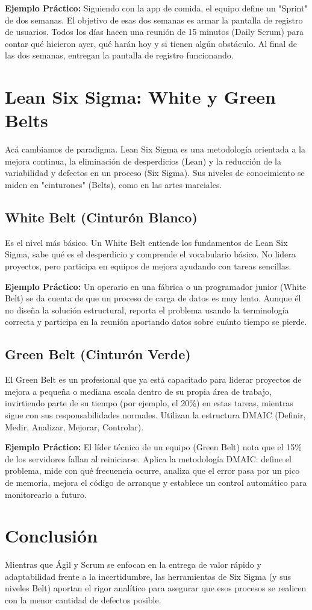 \documentclass[11pt,a4paper]{article}
\begin{document}
\textbf{Ejemplo Práctico:} Siguiendo con la app de comida, el equipo define un "Sprint" de dos semanas. El objetivo de esas dos semanas es armar la pantalla de registro de usuarios. Todos los días hacen una reunión de 15 minutos (Daily Scrum) para contar qué hicieron ayer, qué harán hoy y si tienen algún obstáculo. Al final de las dos semanas, entregan la pantalla de registro funcionando.

\section{Lean Six Sigma: White y Green Belts}
Acá cambiamos de paradigma. Lean Six Sigma es una metodología orientada a la mejora continua, la eliminación de desperdicios (Lean) y la reducción de la variabilidad y defectos en un proceso (Six Sigma). Sus niveles de conocimiento se miden en "cinturones" (Belts), como en las artes marciales.

\subsection{White Belt (Cinturón Blanco)}
Es el nivel más básico. Un White Belt entiende los fundamentos de Lean Six Sigma, sabe qué es el desperdicio y comprende el vocabulario básico. No lidera proyectos, pero participa en equipos de mejora ayudando con tareas sencillas.

\textbf{Ejemplo Práctico:} Un operario en una fábrica o un programador junior (White Belt) se da cuenta de que un proceso de carga de datos es muy lento. Aunque él no diseña la solución estructural, reporta el problema usando la terminología correcta y participa en la reunión aportando datos sobre cuánto tiempo se pierde.

\subsection{Green Belt (Cinturón Verde)}
El Green Belt es un profesional que ya está capacitado para liderar proyectos de mejora a pequeña o mediana escala dentro de su propia área de trabajo, invirtiendo parte de su tiempo (por ejemplo, el 20\%) en estas tareas, mientras sigue con sus responsabilidades normales. Utilizan la estructura DMAIC (Definir, Medir, Analizar, Mejorar, Controlar).

\textbf{Ejemplo Práctico:} El líder técnico de un equipo (Green Belt) nota que el 15\% de los servidores fallan al reiniciarse. Aplica la metodología DMAIC: define el problema, mide con qué frecuencia ocurre, analiza que el error pasa por un pico de memoria, mejora el código de arranque y establece un control automático para monitorearlo a futuro.

\section{Conclusión}
Mientras que Ágil y Scrum se enfocan en la entrega de valor rápido y adaptabilidad frente a la incertidumbre, las herramientas de Six Sigma (y sus niveles Belt) aportan el rigor analítico para asegurar que esos procesos se realicen con la menor cantidad de defectos posible.
\end{document}
